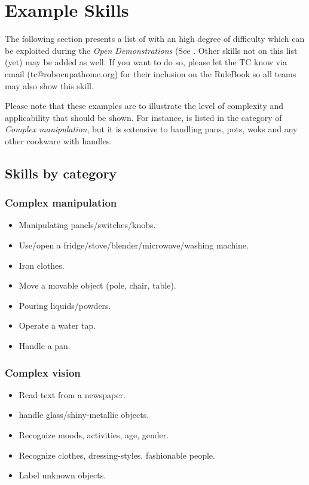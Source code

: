 \chapter{Example Skills}
\label{chap:example-skills}

The following section presents a list of  with an high degree of difficulty which can be exploited during the \textit{Open Demonstrations} (See .
Other skills not on this list (yet) may be added as well. If you want to do so, please let the TC know via email (tc@robocupathome.org) for their inclusion on the RuleBook so all teams may also show this skill.

Please note that these examples are to illustrate the level of complexity and applicability that should be shown. For instance,  is listed in the category of \textit{Complex manipulation}, but it is extensive to handling pans, pots, woks and any other cookware with handles.

\section{Skills by category}

\subsection{Complex manipulation}
\begin{itemize}
	\item Manipulating panels/switches/knobs.
	\item Use/open a fridge/stove/blender/microwave/washing machine.
	\item Iron clothes.
	\item Move a movable object (pole, chair, table).
	\item Pouring liquids/powders.
	\item Operate a water tap.
	\item Handle a pan.
\end{itemize}

\subsection{Complex vision}
\begin{itemize}
	\item Read text from a newspaper.
	\item handle glass/shiny-metallic objects.
	\item Recognize moods, activities, age, gender.
	\item Recognize clothes, dressing-styles, fashionable people.
	\item Label unknown objects.
\end{itemize}

